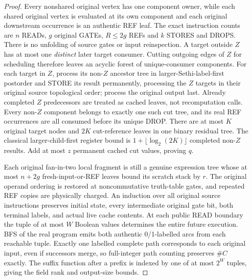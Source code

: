\documentclass[11pt]{article}
\begin{document}
\begin{proof}
Every nonshared original vertex has one component owner, while
each shared original vertex is evaluated at its own component
and each original downstream occurrence is an authentic REF leaf.
The exact instruction counts are $n$ READs, $g$ original GATEs,
$R\le2g$ REFs and $k$ STORES and DROPS. There is no unfolding of
source gates or input reinspection. A target outside $Z$ has at
most one \emph{distinct} later target consumer. Cutting outgoing
edges of $Z$ for scheduling therefore leaves an acyclic forest of
unique-consumer components. For each target in $Z$, process its
non-$Z$ ancestor tree in larger-Sethi-label-first postorder and
STORE its result permanently, processing the $Z$ targets in their
original source topological order; process the original output
last. Already completed $Z$ predecessors are treated as cached
leaves, not recomputation calls. Every non-$Z$ component belongs
to exactly one such cut tree, and its real REF occurrences are
all consumed before its unique DROP. There are at most $K$
original target nodes and $2K$ cut-reference leaves in one
binary residual tree. The classical larger-child-first register
bound is $1+\lfloor\log_2(2K)\rfloor$ completed non-$Z$
results. Add at most $z$ permanent cached cut values, proving $q$.

Each original fan-in-two local fragment is still a genuine
expression tree whose at most $n+2g$ fresh-input-or-REF leaves
bound its scratch stack by $r$. The original operand ordering
is restored at noncommutative truth-table gates, and repeated
REF copies are physically charged. An induction over all
original source instructions preserves initial state, every
intermediate original gate bit, both terminal labels, and actual
live cache contents. At each public READ boundary the tuple
of at most $W$ Boolean values determines the entire future
execution. BFS of the real program emits both authentic
0/1-labelled arcs from each reachable tuple. Exactly one
labelled complete path corresponds to each original input,
even if successors merge, so full-integer path counting
preserves $\#C$ exactly. The suffix function after a prefix
is indexed by one of at most $2^W$ tuples, giving the field
rank and output-size bounds.
\end{proof}
\end{document}
